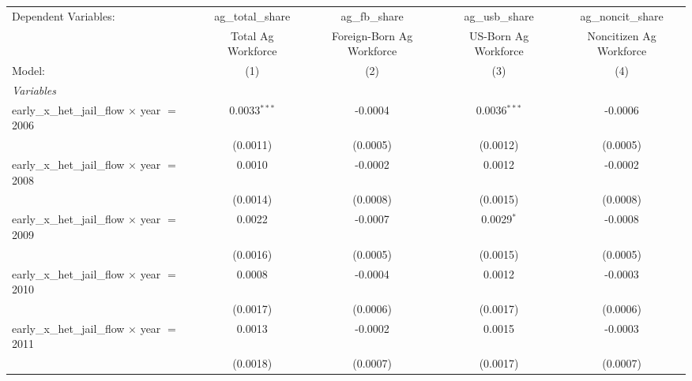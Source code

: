 
\begingroup
\centering
\begin{tabular}{lcccc}
   \tabularnewline \midrule \midrule
   Dependent Variables:                                  & ag\_total\_share       & ag\_fb\_share             & ag\_usb\_share         & ag\_noncit\_share\\    
                                                         & Total Ag Workforce     & Foreign-Born Ag Workforce & US-Born Ag Workforce   & Noncitizen Ag Workforce \\   
   Model:                                                & (1)                    & (2)                       & (3)                    & (4)\\  
   \midrule
   \emph{Variables}\\
   early\_x\_het\_jail\_flow $\times$ year $=$ 2006      & 0.0033$^{***}$         & -0.0004                   & 0.0036$^{***}$         & -0.0006\\   
                                                         & (0.0011)               & (0.0005)                  & (0.0012)               & (0.0005)\\   
   early\_x\_het\_jail\_flow $\times$ year $=$ 2008      & 0.0010                 & -0.0002                   & 0.0012                 & -0.0002\\   
                                                         & (0.0014)               & (0.0008)                  & (0.0015)               & (0.0008)\\   
   early\_x\_het\_jail\_flow $\times$ year $=$ 2009      & 0.0022                 & -0.0007                   & 0.0029$^{*}$           & -0.0008\\   
                                                         & (0.0016)               & (0.0005)                  & (0.0015)               & (0.0005)\\   
   early\_x\_het\_jail\_flow $\times$ year $=$ 2010      & 0.0008                 & -0.0004                   & 0.0012                 & -0.0003\\   
                                                         & (0.0017)               & (0.0006)                  & (0.0017)               & (0.0006)\\   
   early\_x\_het\_jail\_flow $\times$ year $=$ 2011      & 0.0013                 & -0.0002                   & 0.0015                 & -0.0003\\   
                                                         & (0.0018)               & (0.0007)                  & (0.0017)               & (0.0007)\\   

\end{tabular}
